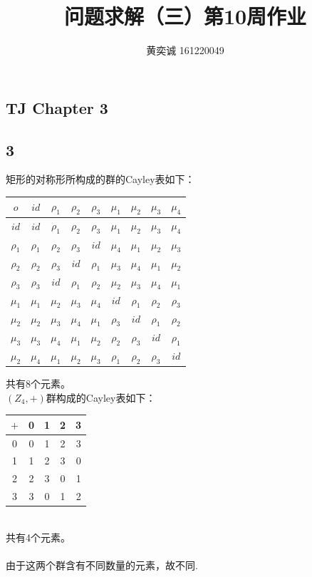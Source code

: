 \documentclass[twocolumn]{article}
\newenvironment{SChinese}{
	\CJKfamily{gbsn}
	\CJKtilde
	\CJKnospace}{}
\begin{document}
	\begin{CJK}{UTF8}{}	
		\begin{SChinese}	
			\title{问题求解（三）第10周作业}
			\author{黄奕诚 161220049}
			\maketitle
			
			\section*{TJ Chapter 3}
				\subsection*{3}
					矩形的对称形所构成的群的Cayley表如下：\\
					\begin{tabular}{c|cccccccc}
						$o$ & $id$ & $\rho_1$ & $\rho_2$ & $\rho_3$ & $\mu_1$ & $\mu_2$ & $\mu_3$ & $\mu_4$ \\
						\hline
						$id$ & $id$ & $\rho_1$ & $\rho_2$ & $\rho_3$ & $\mu_1$ & $\mu_2$ & $\mu_3$ & $\mu_4$ \\
						$\rho_1$ & $\rho_1$ & $\rho_2$ & $\rho_3$ & $id$ & $\mu_4$ & $\mu_1$ & $\mu_2$ & $\mu_3$ \\
						$\rho_2$ & $\rho_2$ & $\rho_3$ & $id$ & $\rho_1$ & $\mu_3$ & $\mu_4$ & $\mu_1$ & $\mu_2$ \\
						$\rho_3$ & $\rho_3$ & $id$ & $\rho_1$ & $\rho_2$ & $\mu_2$ & $\mu_3$ & $\mu_4$ & $\mu_1$ \\
						$\mu_1$ & $\mu_1$ & $\mu_2$ & $\mu_3$ & $\mu_4$ & $id$ & $\rho_1$ & $\rho_2$ & $\rho_3$ \\
						$\mu_2$ & $\mu_2$ & $\mu_3$ & $\mu_4$ & $\mu_1$ & $\rho_3$ & $id$ & $\rho_1$ & $\rho_2$ \\
						$\mu_3$ & $\mu_3$ & $\mu_4$ & $\mu_1$ & $\mu_2$ & $\rho_2$ & $\rho_3$ & $id$ & $\rho_1$ \\
						$\mu_2$ & $\mu_4$ & $\mu_1$ & $\mu_2$ & $\mu_3$ & $\rho_1$ & $\rho_2$ & $\rho_3$ & $id$ \\
					\end{tabular}
					共有8个元素。
					\\$(Z_4,+)$群构成的Cayley表如下：\\
					\begin{tabular}{c|cccc}
						$+$ & 0 & 1 & 2 & 3 \\
						\hline
						0 & 0 & 1 & 2 & 3 \\
						1 & 1 & 2 & 3 & 0 \\
						2 & 2 & 3 & 0 & 1 \\
						3 & 3 & 0 & 1 & 2 \\
					\end{tabular}
					\\共有4个元素。\\
					\\由于这两个群含有不同数量的元素，故不同.
					

\end{SChinese}
\end{CJK}
\end{document}
